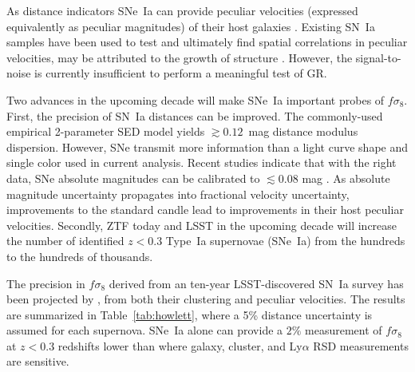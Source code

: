 \documentclass{aastex62}   	%
\begin{document}
As distance indicators SNe~Ia
can provide peculiar velocities (expressed equivalently as peculiar magnitudes)
of their host galaxies \citep{2006PhRvD..73l3526H,2011ApJ...741...67D}.  Existing SN~Ia samples
have been used to test and ultimately find spatial correlations in peculiar velocities, may be attributed to the growth of structure
\citet{2015JCAP...12..033H, 2017JCAP...05..015H}.  However, the signal-to-noise is currently insufficient to perform a meaningful test of GR.

Two advances in the upcoming decade will make SNe~Ia  important probes of $f\sigma_8$.
First, the precision of SN~Ia distances can be improved.  The commonly-used empirical 2-parameter SED model yields $\gtrsim 0.12$~mag distance modulus
dispersion.  However, SNe transmit more information than a light curve shape and single color used in current analysis.
Recent studies indicate that with the right data, SNe absolute
magnitudes can be calibrated to $\lesssim 0.08$ mag \citep[see e.g.][]{2012MNRAS.425.1007B, 2015ApJ...815...58F}.
As absolute magnitude uncertainty propagates into fractional velocity uncertainty, improvements to the standard candle lead to
improvements in their host peculiar velocities.
Secondly,  ZTF today and LSST in the upcoming decade will increase the number of identified  $z<0.3$ Type~Ia supernovae (SNe~Ia)  from the hundreds to the
hundreds of thousands.

The precision in  $f\sigma_8$ derived from an ten-year LSST-discovered  SN~Ia survey has been projected by \citet{2017ApJ...847..128H},
from both their  clustering and peculiar velocities.
The results are summarized in Table~\ref{tab:howlett}, where a 5\% distance uncertainty is assumed for each supernova.
SNe~Ia alone can provide a $2\%$ measurement of $f\sigma_8$ at $z<0.3$ redshifts lower than where galaxy, cluster, and Ly$\alpha$
RSD measurements are sensitive.
\end{document}
